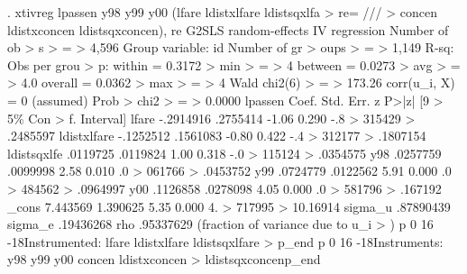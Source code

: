 . xtivreg lpassen y98 y99 y00 (lfare ldistxlfare ldistsqxlfa
> re= ///
> concen ldistxconcen ldistsqxconcen), re
{\smallskip}
G2SLS random-effects IV regression              Number of ob
> s                                                         
>       =                                                   
>              4,596
Group variable: id                              Number of gr
> oups                                                      
>       =                                                   
>              1,149
{\smallskip}
R-sq:                                           Obs per grou
> p:
     within  = 0.3172                                       
>   min                                                     
>       =                                                   
>                  4
     between = 0.0273                                       
>   avg                                                     
>       =                                                   
>                4.0
     overall = 0.0362                                       
>   max                                                     
>       =                                                   
>                  4
{\smallskip}
                                                Wald chi2(6)
>       =                                                   
>             173.26
corr(u_i, X)       = 0 (assumed)                Prob > chi2 
>       =                                                   
>             0.0000
{\smallskip}
     lpassen {\VBAR}      Coef.   Std. Err.      z    P>|z|     [9
> 5\% Con                                                    
>       f. Interval]
       lfare {\VBAR}  -.2914916   .2755414    -1.06   0.290    -.8
> 315429                                                    
>           .2485597
 ldistxlfare {\VBAR}  -.1252512   .1561083    -0.80   0.422    -.4
> 312177                                                    
>           .1807154
ldistsqxlf{\tytilde}e {\VBAR}   .0119725   .0119824     1.00   0.318    -.0
> 115124                                                    
>           .0354575
         y98 {\VBAR}   .0257759   .0099998     2.58   0.010     .0
> 061766                                                    
>           .0453752
         y99 {\VBAR}   .0724779   .0122562     5.91   0.000     .0
> 484562                                                    
>           .0964997
         y00 {\VBAR}   .1126858   .0278098     4.05   0.000     .0
> 581796                                                    
>            .167192
       _cons {\VBAR}   7.443569   1.390625     5.35   0.000     4.
> 717995                                                    
>           10.16914
     sigma_u {\VBAR}  .87890439
     sigma_e {\VBAR}  .19436268
         rho {\VBAR}  .95337629   (fraction of variance due to u_i
> )
{\lbr}p 0 16 -18{\rbr}Instrumented:   lfare ldistxlfare ldistsqxlfare{\lbr}
> p_end{\rbr}
{\lbr}p 0 16 -18{\rbr}Instruments:    y98 y99 y00 concen ldistxconcen 
> ldistsqxconcen{\lbr}p_end{\rbr}
{\smallskip}
